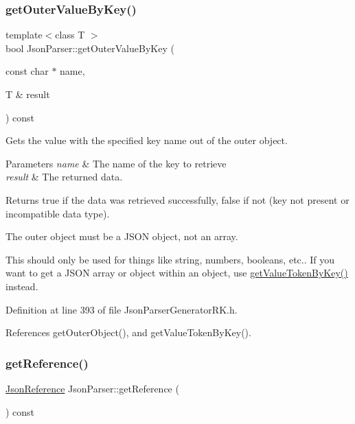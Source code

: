 \subsubsection{\texorpdfstring{get\+Outer\+Value\+By\+Key()}{getOuterValueByKey()}}
{\footnotesize\ttfamily template$<$class T $>$ \\
bool Json\+Parser\+::get\+Outer\+Value\+By\+Key (\begin{DoxyParamCaption}\item[{const char $\ast$}]{name,  }\item[{T \&}]{result }\end{DoxyParamCaption}) const\hspace{0.3cm}{\ttfamily [inline]}}



Gets the value with the specified key name out of the outer object. 


\begin{DoxyParams}{Parameters}
{\em name} & The name of the key to retrieve\\
\hline
{\em result} & The returned data.\\
\hline
\end{DoxyParams}
\begin{DoxyReturn}{Returns}
true if the data was retrieved successfully, false if not (key not present or incompatible data type).
\end{DoxyReturn}
The outer object must be a J\+S\+ON object, not an array.

This should only be used for things like string, numbers, booleans, etc.. If you want to get a J\+S\+ON array or object within an object, use \hyperlink{class_json_parser_a39d613e94d0d6beafe908159f86bc067}{get\+Value\+Token\+By\+Key()} instead. 

Definition at line 393 of file Json\+Parser\+Generator\+R\+K.\+h.



References get\+Outer\+Object(), and get\+Value\+Token\+By\+Key().

\mbox{\label{class_json_parser_a27f639337cff7b364edb05c01f098786}} 
\subsubsection{\texorpdfstring{get\+Reference()}{getReference()}}
{\footnotesize\ttfamily \hyperlink{class_json_reference}{Json\+Reference} Json\+Parser\+::get\+Reference (\begin{DoxyParamCaption}{ }\end{DoxyParamCaption}) const}



